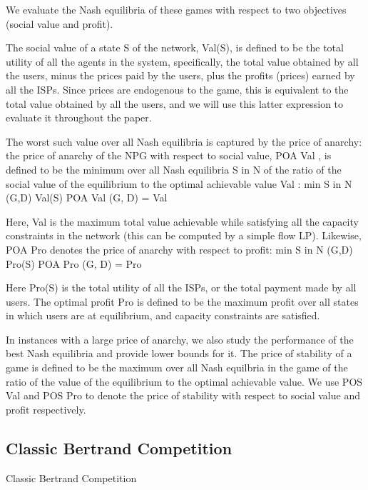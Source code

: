 \documentclass{beamer}
\begin{document}
\begin{frame}
We evaluate the Nash equilibria of these games with respect to two objectives (social value and profit).

The social value of a state S of the network, Val(S), is
defined to be the total utility of all the agents in the system, specifically, the
total value obtained by all the users, minus the prices paid by the users, plus
the profits (prices) earned by all the ISPs. Since prices are endogenous to the
game, this is equivalent to the total value obtained by all the users, and we will
use this latter expression to evaluate it throughout the paper.

The worst such
value over all Nash equilibria is captured by the price of anarchy: the price of
anarchy of the NPG with respect to social value, POA Val , is defined to be the
minimum over all Nash equilibria S in N of the ratio of the social value of the
equilibrium to the optimal achievable value Val  :
min S in N (G,D) Val(S)
POA Val (G, D) = Val 

Here, Val  is the maximum total value achievable while satisfying all the capacity
constraints in the network (this can be computed by a simple flow LP). Likewise,
POA Pro denotes the price of anarchy with respect to profit:
min S in N (G,D) Pro(S)
POA Pro (G, D) = Pro 

Here Pro(S) is the total utility of all the ISPs, or the total payment made by
all users. The optimal profit Pro  is defined to be the maximum profit over all
states in which users are at equilibrium, and capacity constraints are satisfied.


In instances with a large price of anarchy, we also study the performance of
the best Nash equilibria and provide lower bounds for it. The price of stability
of a game is defined to be the maximum over all Nash equilbria in the game
of the ratio of the value of the equilibrium to the optimal achievable value. We
use POS Val and POS Pro to denote the price of stability with respect to social
value and profit respectively.
\end{frame}




\subsection{Classic Bertrand Competition}

\begin{frame}{Classic Bertrand Competition}

\end{frame}
\end{document}
